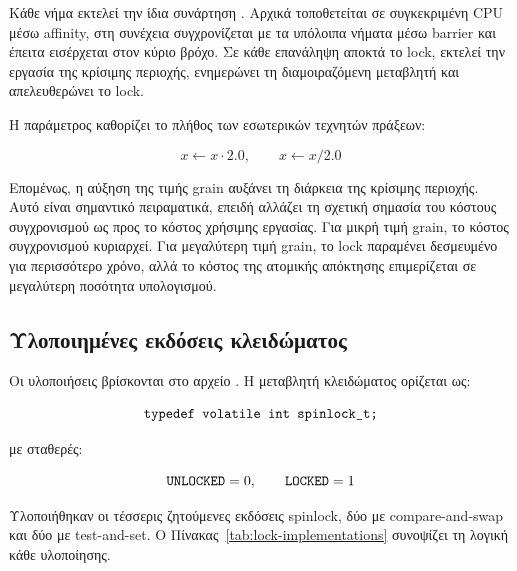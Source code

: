 \documentclass{article}
\newcommand{\code}[1]{\texttt{\detokenize{#1}}}
\begin{document}
Κάθε νήμα εκτελεί την ίδια συνάρτηση \code{thread_fn}. Αρχικά τοποθετείται σε συγκεκριμένη CPU μέσω affinity, στη συνέχεια συγχρονίζεται με τα υπόλοιπα νήματα μέσω barrier και έπειτα εισέρχεται στον κύριο βρόχο. Σε κάθε επανάληψη αποκτά το lock, εκτελεί την εργασία της κρίσιμης περιοχής, ενημερώνει τη διαμοιραζόμενη μεταβλητή \code{val} και απελευθερώνει το lock.

Η παράμετρος \code{grain} καθορίζει το πλήθος των εσωτερικών τεχνητών πράξεων:

\[
x \leftarrow x \cdot 2.0,\qquad x \leftarrow x / 2.0
\]

Επομένως, η αύξηση της τιμής grain αυξάνει τη διάρκεια της κρίσιμης περιοχής. Αυτό είναι σημαντικό πειραματικά, επειδή αλλάζει τη σχετική σημασία του κόστους συγχρονισμού ως προς το κόστος χρήσιμης εργασίας. Για μικρή τιμή grain, το κόστος συγχρονισμού κυριαρχεί. Για μεγαλύτερη τιμή grain, το lock παραμένει δεσμευμένο για περισσότερο χρόνο, αλλά το κόστος της ατομικής απόκτησης επιμερίζεται σε μεγαλύτερη ποσότητα υπολογισμού.

\subsection{Υλοποιημένες εκδόσεις κλειδώματος}

Οι υλοποιήσεις βρίσκονται στο αρχείο \code{lock.h}. Η μεταβλητή κλειδώματος ορίζεται ως:

\[
\code{typedef volatile int spinlock_t;}
\]

με σταθερές:

\[
\code{UNLOCKED} = 0,\qquad \code{LOCKED} = 1
\]

Υλοποιήθηκαν οι τέσσερις ζητούμενες εκδόσεις spinlock, δύο με compare-and-swap και δύο με test-and-set. Ο Πίνακας~\ref{tab:lock-implementations} συνοψίζει τη λογική κάθε υλοποίησης.
\end{document}
